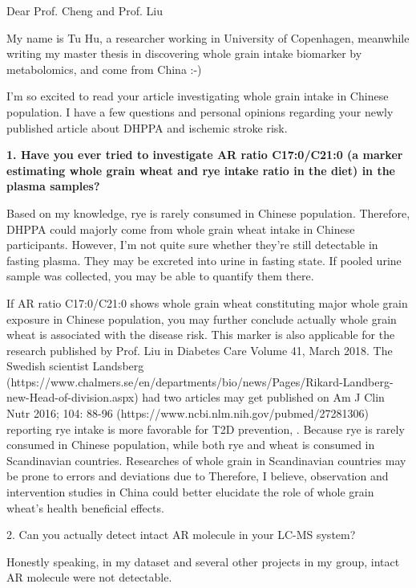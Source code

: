 \documentclass[]{letter}
\begin{document}

\begin{letter}
\address{}

\opening{Dear Prof. Cheng and Prof. Liu}

My name is Tu Hu, a researcher working in University of Copenhagen, meanwhile writing my master thesis in discovering whole grain intake biomarker by metabolomics, and come from China :-)

I’m so excited to read your article investigating whole grain intake in Chinese population. I have a few questions and personal opinions regarding your newly published article about DHPPA and ischemic stroke risk\cite{10.1093/ajcn/nqy323}. 


\textbf{1.	Have you ever tried to investigate AR ratio C17:0/C21:0 (a marker estimating whole grain wheat and rye intake ratio in the diet) in the plasma samples?}

Based on my knowledge, rye is rarely consumed in Chinese population. Therefore, DHPPA could majorly come from whole grain wheat intake in Chinese participants. However, I’m not quite sure whether they’re still detectable in fasting plasma. They may be excreted into urine in fasting state. If pooled urine sample was collected, you may be able to quantify them there.

If AR ratio C17:0/C21:0 shows whole grain wheat constituting major whole grain exposure in Chinese population, you may further conclude actually whole grain wheat is associated with the disease risk.
This marker is also applicable for the research published by Prof. Liu in Diabetes Care Volume 41, March 2018. 
The Swedish scientist Landsberg (https://www.chalmers.se/en/departments/bio/news/Pages/Rikard-Landberg-new-Head-of-division.aspx) had two articles may get 
published on Am J Clin Nutr 2016; 104: 88-96 (https://www.ncbi.nlm.nih.gov/pubmed/27281306) reporting rye intake is more favorable for T2D prevention, . 
Because rye is rarely consumed in Chinese population, while both rye and wheat is consumed in Scandinavian countries. Researches of whole grain in Scandinavian countries may be prone to errors and deviations due to 
Therefore, I believe, observation and intervention studies in China could better elucidate the role of whole grain wheat’s health beneficial effects.

2.	Can you actually detect intact AR molecule in your LC-MS system?

Honestly speaking, in my dataset and several other projects in my group, intact AR molecule were not detectable.


\end{letter}
\end{document}
